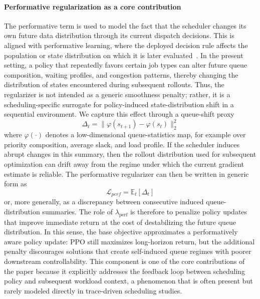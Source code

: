 \documentclass[journal]{IEEEtran}
\begin{document}
\paragraph{Performative regularization as a core contribution}
The performative term is used to model the fact that the scheduler changes its own future data distribution through its current dispatch decisions. This is aligned with performative learning, where the deployed decision rule affects the population or state distribution on which it is later evaluated~\cite{perdomo2020performative,mandal2023performative}. In the present setting, a policy that repeatedly favors certain job types can alter future queue composition, waiting profiles, and congestion patterns, thereby changing the distribution of states encountered during subsequent rollouts. Thus, the regularizer is not intended as a generic smoothness penalty; rather, it is a scheduling-specific surrogate for policy-induced state-distribution shift in a sequential environment. We capture this effect through a queue-shift proxy
\begin{equation}
\Delta_t = \| \varphi(s_{t+1}) - \varphi(s_t) \|_2^2
\end{equation}
where $\varphi(\cdot)$ denotes a low-dimensional queue-statistics map, for example over priority composition, average slack, and load profile. If the scheduler induces abrupt changes in this summary, then the rollout distribution used for subsequent optimization can drift away from the regime under which the current gradient estimate is reliable. The performative regularizer can then be written in generic form as
\begin{equation}
\mathcal{L}_{perf} = \mathbb{E}_t[\Delta_t]
\end{equation}
or, more generally, as a discrepancy between consecutive induced queue-distribution summaries. The role of $\lambda_{\text{perf}}$ is therefore to penalize policy updates that improve immediate return at the cost of destabilizing the future queue distribution. In this sense, the base objective approximates a performatively aware policy update: PPO still maximizes long-horizon return, but the additional penalty discourages solutions that create self-induced queue regimes with poorer downstream controllability. This component is one of the core contributions of the paper because it explicitly addresses the feedback loop between scheduling policy and subsequent workload context, a phenomenon that is often present but rarely modeled directly in trace-driven scheduling studies.
\end{document}
